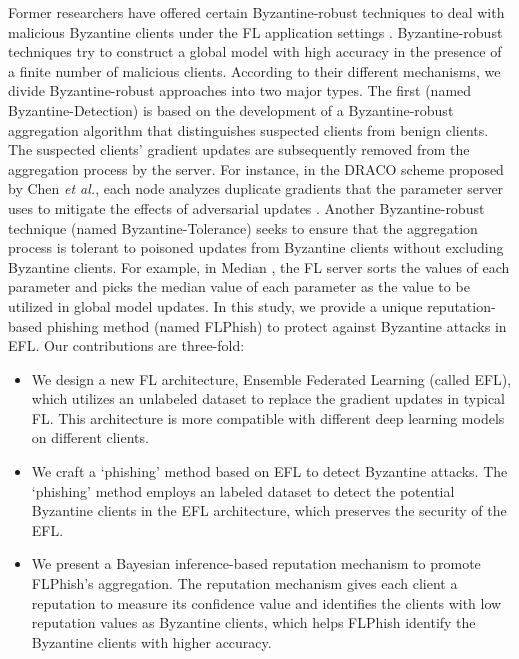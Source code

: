 \documentclass[journal]{IEEEtran}
\begin{document}
\par Former researchers have offered certain Byzantine-robust techniques to deal with malicious Byzantine clients under the FL application settings \cite{ref_12_defense,ref_13_defense,ref_15_defense,ref_16_defense,ref_17_defense,ref_28_defense,ref_29_defense,ref_30_defense,ref_31_defense,ref_32_defense}. Byzantine-robust techniques try to construct a global model with high accuracy in the presence of a finite number of malicious clients. According to their different mechanisms, we divide Byzantine-robust approaches into two major types. The first (named Byzantine-Detection) is based on the development of a Byzantine-robust aggregation algorithm that distinguishes suspected clients from benign clients. The suspected clients' gradient updates are subsequently removed from the aggregation process by the server. For instance, in the DRACO scheme proposed by Chen \textit{et al.}, each node analyzes duplicate gradients that the parameter server uses to mitigate the effects of adversarial updates \cite{ref_13_defense}. Another Byzantine-robust technique (named Byzantine-Tolerance) seeks to ensure that the aggregation process is tolerant to poisoned updates from Byzantine clients without excluding Byzantine clients. For example, in Median \cite{ref_16_defense}, the FL server sorts the values of each parameter and picks the median value of each parameter as the value to be utilized in global model updates. In this study, we provide a unique reputation-based phishing method (named FLPhish) to protect against Byzantine attacks in EFL. Our contributions are three-fold:
\begin{itemize}
  \item We design a new FL architecture, Ensemble Federated Learning (called EFL), which utilizes an unlabeled dataset to replace the gradient updates in typical FL. This architecture is more compatible with different deep learning models on different clients.
  \item We craft a `phishing' method based on EFL to detect Byzantine attacks. The `phishing' method employs an labeled dataset to detect the potential Byzantine clients in the EFL architecture, which preserves the security of the EFL.
  \item We present a Bayesian inference-based reputation mechanism to promote FLPhish's aggregation. The reputation mechanism gives each client a reputation to measure its confidence value and identifies the clients with low reputation values as Byzantine clients, which helps FLPhish identify the Byzantine clients with higher accuracy.
\end{itemize}
\end{document}
